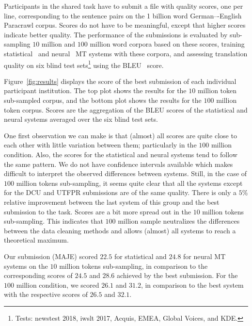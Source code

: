 Participants in the shared task have to submit a file with quality scores, one per line, corresponding to the sentence pairs on the 1 billion word German–-English Paracrawl corpus. Scores do not have to be meaningful, except that higher scores indicate better quality. The performance of the submissions is evaluated by sub-sampling $10$ million and $100$ million word corpora based on these scores, training statistical~\cite{Moses} and neural~\cite{Marian} MT systems with these corpora, and assessing translation quality on six blind test sets\footnote{Tests: newstest 2018, iwslt 2017, Acquis, EMEA, Global Voices, and KDE.} using the BLEU~\cite{Bleu} score. 

Figure~\ref{fig:results} displays the score of the best submission of each individual participant institution. The top plot shows the results for the $10$ million token sub-sampled corpus, and the bottom plot shows the results for the $100$ million token corpus. Scores are the aggregation of the BLEU scores of the statistical and neural systems averaged over the six blind test sets.

One first observation we can make is that (almost) all scores are quite close to each other with little variation between them; particularly in the $100$ million condition. Also, the scores for the statistical and neural systems tend to follow the same pattern. We do not have confidence intervals available which makes difficult to interpret the observed differences between systems. Still, in the case of $100$ million tokens sub-sampling, it seems quite clear that all the systems except for the DCU and UTFPR submissions are of the same quality. There is only a $5\%$ relative improvement between the last system of this group and the best submission to the task. Scores are a bit more spread out in the $10$ million tokens sub-sampling. This indicates that $100$ million sample neutralizes the differences between the data cleaning methods and allows (almost) all systems to reach a theoretical maximum.

Our submission (MAJE) scored $22.5$ for statistical and $24.8$ for neural MT systems on the $10$ million tokens sub-sampling, in comparison to the corresponding scores of $24.5$ and $28.6$ achieved by the best submission. For the $100$ million condition, we scored $26.1$ and $31.2$, in comparison to the best system with the respective scores of $26.5$ and $32.1$. 
